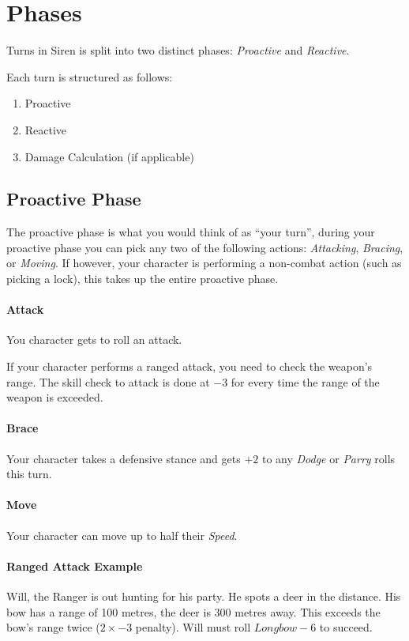 \section{Phases}\label{sec:phases}
Turns in Siren is split into two distinct phases: \textit{Proactive} and \textit{Reactive}.

Each turn is structured as follows:
\begin{enumerate}
  \item Proactive 
  \item Reactive
  \item Damage Calculation (if applicable)
\end{enumerate}

\subsection{Proactive Phase}
The proactive phase is what you would think of as ``your turn'', during your proactive phase you can pick any two of the following actions: \textit{Attacking}, \textit{Bracing}, or \textit{Moving}.
If however, your character is performing a non-combat action (such as picking a lock), this takes up the entire proactive phase.

\paragraph{Attack}
You character gets to roll an attack.

If your character performs a ranged attack, you need to check the weapon's range.
The skill check to attack is done at $-3$ for every time the range of the weapon is exceeded.

\paragraph{Brace}
Your character takes a defensive stance and gets $+2$ to any \textit{Dodge} or \textit{Parry} rolls this turn.

\paragraph{Move}
Your character can move up to half their \textit{Speed}.

\paragraph{Ranged Attack Example} Will, the Ranger is out hunting for his party. He spots a deer in the distance. His bow has a range of 100 metres, the deer is 300 metres away. This exceeds the bow's range twice ($2\times -3$ penalty). Will must roll $Longbow-6$ to succeed.

